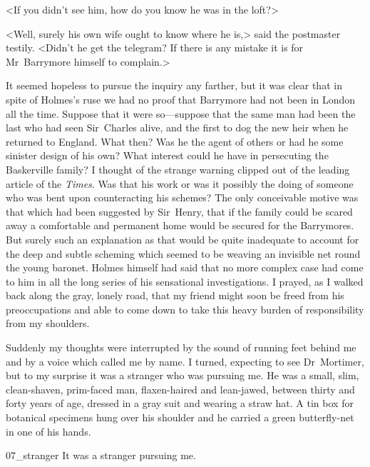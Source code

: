 <If you didn't see him, how do you know he was in the loft?>

<Well, surely his own wife ought to know where he is,> said the postmaster testily. <Didn't he get the telegram? If there is any mistake it is for Mr~Barrymore himself to complain.>

It seemed hopeless to pursue the inquiry any farther, but it was clear that in spite of Holmes's ruse we had no proof that Barrymore had not been in London all the time. Suppose that it were so—\allowbreak suppose that the same man had been the last who had seen Sir~Charles alive, and the first to dog the new heir when he returned to England. What then? Was he the agent of others or had he some sinister design of his own? What interest could he have in persecuting the Baskerville family? I thought of the strange warning clipped out of the leading article of the \textit{Times}. Was that his work or was it possibly the doing of someone who was bent upon counteracting his schemes? The only conceivable motive was that which had been suggested by Sir~Henry, that if the family could be scared away a comfortable and permanent home would be secured for the Barrymores. But surely such an explanation as that would be quite inadequate to account for the deep and subtle scheming which seemed to be weaving an invisible net round the young baronet. Holmes himself had said that no more complex case had come to him in all the long series of his sensational investigations. I prayed, as I walked back along the gray, lonely road, that my friend might soon be freed from his preoccupations and able to come down to take this heavy burden of responsibility from my shoulders.

Suddenly my thoughts were interrupted by the sound of running feet behind me and by a voice which called me by name. I turned, expecting to see Dr~Mortimer, but to my surprise it was a stranger who was pursuing me. He was a small, slim, clean-shaven, prim-faced man, flaxen-haired and lean-jawed, between thirty and forty years of age, dressed in a gray suit and wearing a straw hat. A tin box for botanical specimens hung over his shoulder and he carried a green butterfly-net in one of his hands.


\begin{bwbigpic}
		[1.0]  
	{07_stranger}
	{It was a stranger pursuing me.}
\end{bwbigpic}


